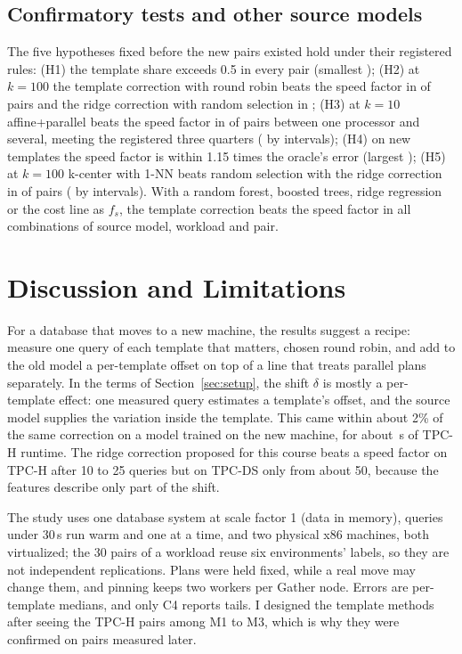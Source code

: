 \documentclass{article}
\begin{document}
\subsection{Confirmatory tests and other source models}
\label{sec:confirm}
The five hypotheses fixed before the \PHPairs{} new pairs existed hold under their registered rules: (H1) the template share exceeds 0.5 in every pair (smallest \PHHOneMin); (H2) at $k=100$ the template correction with round robin beats the speed factor in \PHHTwoVsSpeedOk{} of \PHHTwoN{} pairs and the ridge correction with random selection in \PHHTwoVsRidgeOk; (H3) at $k=10$ affine+parallel beats the speed factor in \PHHThreeOk{} of \PHHThreeN{} pairs between one processor and several, meeting the registered three quarters (\PHHThreeOkCI{} by intervals); (H4) on new templates the speed factor is within 1.15 times the oracle's error (largest \PHHFourMax); (H5) at $k=100$ k-center with 1-NN beats random selection with the ridge correction in \PHHFiveOk{} of \PHHFiveN{} pairs (\PHHFiveOkCI{} by intervals). With a random forest, boosted trees, ridge regression or the cost line as $f_s$, the template correction beats the speed factor in all \SrcWinsTotal{} combinations of source model, workload and pair.

\section{Discussion and Limitations}
For a database that moves to a new machine, the results suggest a recipe: measure one query of each template that matters, chosen round robin, and add to the old model a per-template offset on top of a line that treats parallel plans separately. In the terms of Section~\ref{sec:setup}, the shift $\delta$ is mostly a per-template effect: one measured query estimates a template's offset, and the source model supplies the variation inside the template. This came within about 2\% of the same correction on a model trained on the new machine, for about \PLTpchKTwoFiveRoundRobinCalibrationS\,s of TPC-H runtime. The ridge correction proposed for this course beats a speed factor on TPC-H after 10 to 25 queries but on TPC-DS only from about 50, because the features describe only part of the shift.

The study uses one database system at scale factor 1 (data in memory), queries under 30\,s run warm and one at a time, and two physical x86 machines, both virtualized; the 30 pairs of a workload reuse six environments' labels, so they are not independent replications. Plans were held fixed, while a real move may change them, and pinning keeps two workers per Gather node. Errors are per-template medians, and only C4 reports tails. I designed the template methods after seeing the TPC-H pairs among M1 to M3, which is why they were confirmed on pairs measured later.
\end{document}
